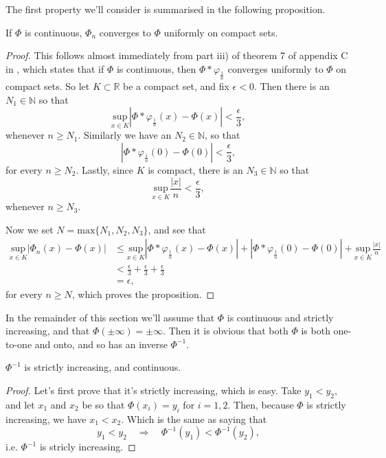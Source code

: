 \documentclass[11pt, a4paper]{article}
\begin{document}
\begin{appendix}
The first property we'll consider is summarised in the following proposition.
\begin{proposition}
If $\Phi$ is continuous, $\Phi_n$ converges to $\Phi$ uniformly on compact sets.
\end{proposition}
\begin{proof}
This follows almost immediately from part iii) of theorem 7 of appendix C in \citep{evans}, which states that if $\Phi$ is continuous, then $\Phi * \varphi_{\frac{1}{n}}$ converges uniformly to $\Phi$ on compact sets. So let $K\subset \mathbb{R}$ be a compact set, and fix $\epsilon < 0$. Then there is an $N_1 \in \mathbb{N}$ so that
\begin{equation*}
\underset{x\in K}{\mathrm{sup}}|\Phi * \varphi_{\frac{1}{n}}(x) - \Phi(x)| < \frac{\epsilon}{3},
\end{equation*} 
whenever $n \geq N_1$. Similarly we have an $N_2 \in \mathbb{N}$, so that 
\begin{equation*}
|\Phi * \varphi_{\frac{1}{n}}(0) - \Phi(0)| < \frac{\epsilon}{3},
\end{equation*}
for every $n \geq N_2$. Lastly, since $K$ is compact, there is an $N_3 \in \mathbb{N}$ so that
\begin{equation*}
\underset{x\in K}{\mathrm{sup}}\frac{|x|}{n} < \frac{\epsilon}{3},
\end{equation*}
whenever $n \geq N_3$.

Now we set $N = \mathrm{max}\{N_1,N_2,N_3\}$, and see that
\begin{align*}
\underset{x\in K}{\mathrm{sup}}|\Phi_n(x) - \Phi(x)| &\leq  \underset{x\in K}{\mathrm{sup}}|\Phi * \varphi_{\frac{1}{n}}(x) - \Phi(x)| + |\Phi * \varphi_{\frac{1}{n}}(0) - \Phi(0)| + \underset{x\in K}{\mathrm{sup}}\frac{|x|}{n} \\
&< \frac{\epsilon}{3} + \frac{\epsilon}{3} + \frac{\epsilon}{3} \\
&= \epsilon,
\end{align*}
for every $n \geq N$, which proves the proposition.
\end{proof}

In the remainder of this section we'll assume that $\Phi$ is continuous and strictly increasing, and that $\Phi( \pm \infty) = \pm \infty$. Then it is obvious that both $\Phi$ is both one-to-one and onto, and so has an inverse $\Phi^{-1}$.

\begin{proposition}
$\Phi^{-1}$ is strictly increasing, and continuous.
\end{proposition}
\begin{proof}
Let's first prove that it's strictly increasing, which is easy. Take $y_1 < y_2$, and let $x_1$ and $x_2$ be so that $\Phi(x_i) = y_i$ for $i=1,2$. Then, because $\Phi$ is strictly increasing, we have $x_1 < x_2$. Which is the same as saying that
\begin{equation*}
y_1 < y_2 \quad \Rightarrow \quad \Phi^{-1}(y_1) < \Phi^{-1}(y_2),
\end{equation*}
i.e. $\Phi^{-1}$ is stricly increasing.


\end{proof}
\end{appendix}
\end{document}
